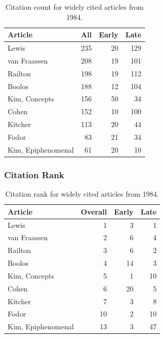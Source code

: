 \documentclass[
  10pt,
  letterpaper,
  DIV=11,
  numbers=noendperiod,
  twoside]{scrartcl}
\begin{document}
\begin{longtable}[]{@{}lrrr@{}}

\caption{\label{tbl-citation-count-1984}Citation count for widely cited
articles from 1984.}

\tabularnewline

\toprule\noalign{}
Article & All & Early & Late \\
\midrule\noalign{}
\endhead
\bottomrule\noalign{}
\endlastfoot
Lewis & 235 & 20 & 129 \\
van Fraassen & 208 & 19 & 101 \\
Railton & 198 & 19 & 112 \\
Boolos & 188 & 12 & 104 \\
Kim, Concepts & 156 & 50 & 34 \\
Cohen & 152 & 10 & 100 \\
Kitcher & 113 & 20 & 44 \\
Fodor & 83 & 21 & 34 \\
Kim, Epiphenomenal & 61 & 20 & 10 \\

\end{longtable}

\subsubsection*{Citation Rank}\label{sec-rank-1984}

\begin{longtable}[]{@{}lrrr@{}}

\caption{\label{tbl-citation-rank-1984}Citation rank for widely cited
articles from 1984.}

\tabularnewline

\toprule\noalign{}
Article & Overall & Early & Late \\
\midrule\noalign{}
\endhead
\bottomrule\noalign{}
\endlastfoot
Lewis & 1 & 3 & 1 \\
van Fraassen & 2 & 6 & 4 \\
Railton & 3 & 6 & 2 \\
Boolos & 4 & 14 & 3 \\
Kim, Concepts & 5 & 1 & 10 \\
Cohen & 6 & 20 & 5 \\
Kitcher & 7 & 3 & 8 \\
Fodor & 10 & 2 & 10 \\
Kim, Epiphenomenal & 13 & 3 & 47 \\

\end{longtable}
\end{document}
